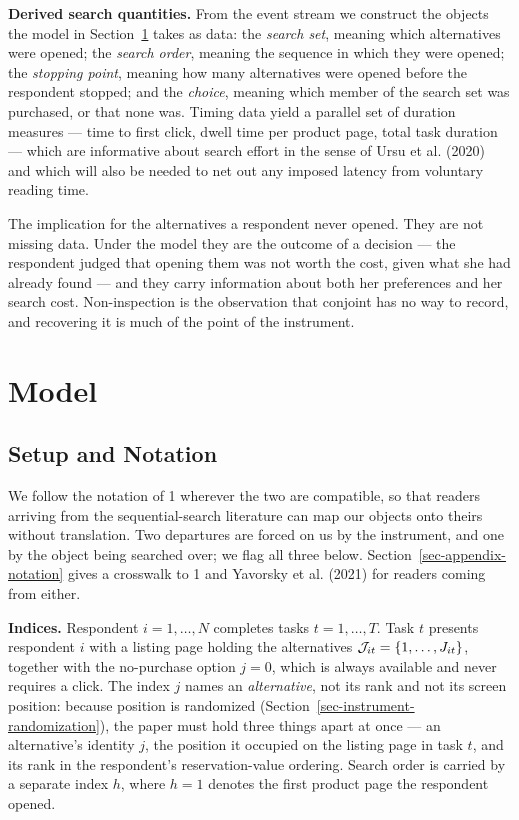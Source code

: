 \documentclass[
  letterpaper,
  DIV=11,
  numbers=noendperiod]{scrartcl}
\newcounter{none} %
\begin{document}
\textbf{Derived search quantities.} From the event stream we construct
the objects the model in Section~\ref{sec-model} takes as data: the
\emph{search set}, meaning which alternatives were opened; the
\emph{search order}, meaning the sequence in which they were opened; the
\emph{stopping point}, meaning how many alternatives were opened before
the respondent stopped; and the \emph{choice}, meaning which member of
the search set was purchased, or that none was. Timing data yield a
parallel set of duration measures --- time to first click, dwell time
per product page, total task duration --- which are informative about
search effort in the sense of Ursu et al. (2020) and which will also be
needed to net out any imposed latency from voluntary reading time.

The implication for the alternatives a respondent never opened. They are
not missing data. Under the model they are the outcome of a decision ---
the respondent judged that opening them was not worth the cost, given
what she had already found --- and they carry information about both her
preferences and her search cost. Non-inspection is the observation that
conjoint has no way to record, and recovering it is much of the point of
the instrument.

\section{Model}\label{sec-model}

\subsection{Setup and Notation}\label{sec-model-setup}

We follow the notation of 1 wherever the two are compatible, so that
readers arriving from the sequential-search literature can map our
objects onto theirs without translation. Two departures are forced on us
by the instrument, and one by the object being searched over; we flag
all three below. Section~\ref{sec-appendix-notation} gives a crosswalk
to 1 and Yavorsky et al. (2021) for readers coming from either.

\textbf{Indices.} Respondent \(i = 1,\dots,N\) completes tasks
\(t = 1,\dots,T\). Task \(t\) presents respondent \(i\) with a listing
page holding the alternatives \(\mathcal{J}_{it} = \{1,\dots,J_{it}\}\),
together with the no-purchase option \(j=0\), which is always available
and never requires a click. The index \(j\) names an \emph{alternative},
not its rank and not its screen position: because position is randomized
(Section~\ref{sec-instrument-randomization}), the paper must hold three
things apart at once --- an alternative's identity \(j\), the position
it occupied on the listing page in task \(t\), and its rank in the
respondent's reservation-value ordering. Search order is carried by a
separate index \(h\), where \(h=1\) denotes the first product page the
respondent opened.
\end{document}
